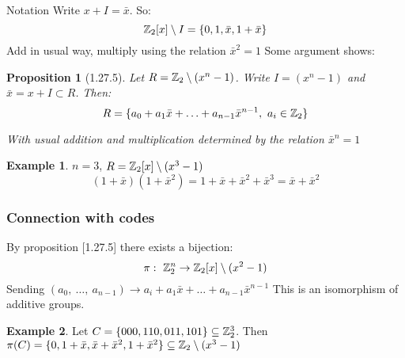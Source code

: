 \documentclass[]{article}
\newtheorem{prop}[thm]{Proposition}
\theoremstyle{definition}
\newtheorem*{exmp}{Example}
\theoremstyle{remark}
\numberwithin{equation}{section}
\begin{document}
			\par{Notation} Write $x+I = \bar{x}$. So:
			\[
				\mathbb{Z}_2[x]\setminus I = \{0,1,\bar{x},1+\bar{x}\}
			\]
			Add in usual way, multiply using the relation $\bar{x}^2 = 1$
			Some argument shows:
			\begin{prop}[1.27.5]
				Let $R = \mathbb{Z}_2 \setminus (x^n -1)$. Write $I = (x^n-1)$ and $\bar{x} = x+I \subset R$. Then:
				\[
					R= \{a_0 + a_1 \bar{x} + \hdots + a_{n-1} \bar{x}^{n-1},\ a_i \in \mathbb{Z}_2\}
				\]

				With usual addition and multiplication determined by the relation $\bar{x}^n = 1$
			\end{prop}

			\begin{exmp}
				$n = 3$, $R = \mathbb{Z}_2[x] \setminus (x^3 -1)$
				\[
					(1+\bar{x})(1+\bar{x}^2) = 1 + \bar{x} + \bar{x}^2 + \bar{x}^3 = \bar{x} + \bar{x} ^2
				\]
			\end{exmp}
			\subsubsection{Connection with codes}
				By proposition [1.27.5] there exists a bijection:
				\[
				\pi: \ \mathbb{Z}_2^n \rightarrow \mathbb{Z}_2[x]\setminus(x^2-1)
				\]
				Sending $(a_0,\ \hdots,\ a_{n-1}) \rightarrow a_i + a_1 \bar{x} + \hdots + a_{n-1} \bar{x}^{n-1}$
				This is an isomorphism of additive groups.
				\begin{exmp}
					Let $C = \{000,110,011,101\}\subseteq \mathbb{Z}_2^3$. Then $\pi(C)= \{0, 1+\bar{x},\bar{x}+\bar{x}^2, 1+\bar{x}^2\} \subseteq \mathbb{Z}_2 \setminus (x^3-1)$
				\end{exmp}
\end{document}
